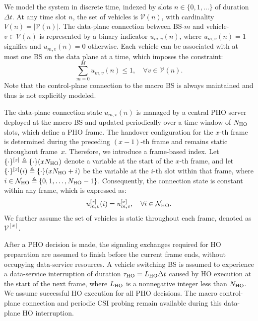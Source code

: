 \documentclass[conference, a4paper]{IEEEtran}
\newcommand{\rev}[1]{\textcolor{revisioncolor}{{}#1}}
\newif\ifshowdeletions
\newcommand{\currentdel}[1]{\ifshowdeletions\textcolor{deletioncolor}{\sout{#1}}\fi}
\theoremstyle{remark}
\begin{document}
We model the system in discrete time, indexed by slots $n \in \{0, 1, \dots\}$ of duration $\Delta t$. At any time slot $n$, the set of vehicles is $\mathcal{V}(n)$, with cardinality $V(n) = |\mathcal{V}(n)|$. The {data-plane}
connection between BS-$m$ and vehicle-$v \in \mathcal{V}(n)$ is represented by a binary indicator $u_{m,v}(n)$, where $u_{m,v}(n)=1$ signifies \currentdel{an active data-plane connection} and $u_{m,v}(n)=0$ otherwise. Each vehicle can be associated with at most one BS on the data plane at a time, which imposes the constraint:
\begin{equation}
    \sum_{m=0}^{M} u_{m,v}(n) \leq 1, \quad \forall v \in \mathcal{V}(n).
    \label{eq:connection_cons}
\end{equation}
Note that the control-plane connection to the macro BS is always maintained and thus is not explicitly modeled.

The data-plane connection state $u_{m,v}(n)$ is managed by a central PHO server deployed at the macro BS and updated periodically over a time window of $N_{\rm HO}$ slots, which define a PHO frame. The handover configuration for the $x$-th frame is determined during the preceding $(x-1)$-th frame and remains static throughout frame~$x$. Therefore, we introduce a frame-based index. Let $\{\cdot\}^{[x]} \triangleq \{\cdot\}(xN_{\rm HO})$ denote a variable at the start of the $x$-th frame, and let $\{\cdot\}^{[x]}(i) \triangleq \{\cdot\}(xN_{\rm HO} + i)$ be the variable at the $i$-th slot within that frame, where $i \in \mathcal{N}_{\rm HO} \triangleq \{0,1,\dots,N_{\rm HO}-1\}$. Consequently, the connection state is constant within any frame, which is expressed as:
    \begin{equation}
        u_{m,v}^{[x]}(i) = u_{m,v}^{[x]}, \quad \forall i \in \mathcal{N}_{\rm HO}.
        \label{eq:PHO_cons}
    \end{equation}
We further assume the set of vehicles is static throughout each frame, denoted as $\mathcal{V}^{[x]}$.

\rev{After a PHO decision is made, the signaling exchanges required for HO preparation are assumed to finish before the current frame ends, without occupying data-service resources. A vehicle switching BS is assumed to experience a data-service interruption of duration $\tau_{\rm HO}=L_{\rm HO}\Delta t$ caused by HO execution at the start of the next frame, where $L_{\rm HO}$ is a nonnegative integer less than $N_{\rm HO}$. We assume successful HO execution for all PHO decisions. The macro control-plane connection and periodic CSI probing remain available during this data-plane HO interruption.}
\end{document}
